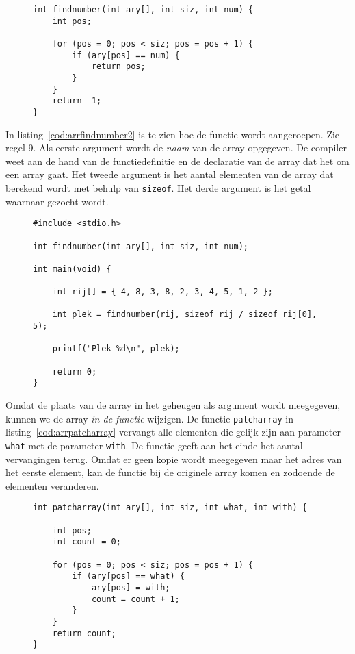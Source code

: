 \begin{figure}[H]
\begin{lstlisting}[caption=Functie voor het vinden van een getal in een array.,label=cod:arrfindnumber]
int findnumber(int ary[], int siz, int num) {
    int pos;

    for (pos = 0; pos < siz; pos = pos + 1) {
        if (ary[pos] == num) {
            return pos;
        }
    }
    return -1;
}
\end{lstlisting}
\end{figure}

In listing~\ref{cod:arrfindnumber2} is te zien hoe de functie wordt aangeroepen. Zie regel 9. Als eerste argument wordt de \textsl{naam} van de array opgegeven. De compiler weet aan de hand van de functiedefinitie en de declaratie van de array dat het om een array gaat. Het tweede argument is het aantal elementen van de array dat berekend wordt met behulp van  \texttt{sizeof}. Het derde argument is het getal waarnaar gezocht wordt.

\begin{figure}[!ht]
\begin{lstlisting}[caption=Aanroepen van de functie \texttt{findnumber}.,label=cod:arrfindnumber2]
#include <stdio.h>

int findnumber(int ary[], int siz, int num);

int main(void) {

    int rij[] = { 4, 8, 3, 8, 2, 3, 4, 5, 1, 2 };

    int plek = findnumber(rij, sizeof rij / sizeof rij[0], 5);

    printf("Plek %d\n", plek);

    return 0;
}
\end{lstlisting}
\end{figure}

Omdat de plaats van de array in het geheugen als argument wordt meegegeven, kunnen we de array \textsl{in de functie} wijzigen. De functie \texttt{patcharray} in listing~\ref{cod:arrpatcharray} vervangt alle elementen die gelijk zijn aan parameter \texttt{what} met de parameter \texttt{with}. De functie geeft aan het einde het aantal vervangingen terug. Omdat er geen kopie wordt meegegeven maar het adres van het eerste element, kan de functie bij de originele array komen en zodoende de elementen veranderen.

\begin{figure}[!ht]
\begin{lstlisting}[caption=Functie om een getal te vervangen door een ander getal.,label=cod:arrpatcharray]
int patcharray(int ary[], int siz, int what, int with) {

    int pos;
    int count = 0;

    for (pos = 0; pos < siz; pos = pos + 1) {
        if (ary[pos] == what) {
            ary[pos] = with;
            count = count + 1;
        }
    }
    return count;
}
\end{lstlisting}
\end{figure}


